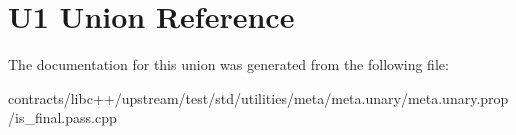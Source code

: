 \hypertarget{union_u1}{}\section{U1 Union Reference}
\label{union_u1}


The documentation for this union was generated from the following file\+:\begin{DoxyCompactItemize}
\item 
contracts/libc++/upstream/test/std/utilities/meta/meta.\+unary/meta.\+unary.\+prop/is\+\_\+final.\+pass.\+cpp\end{DoxyCompactItemize}
